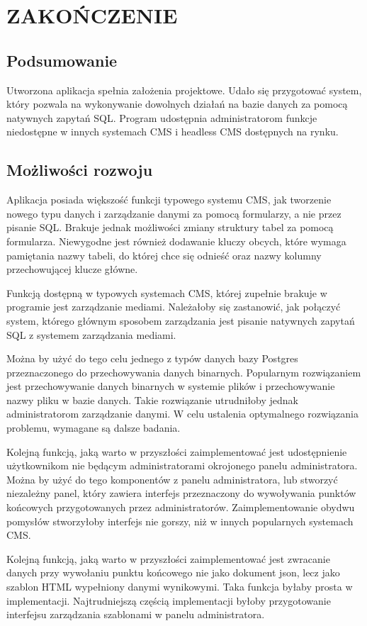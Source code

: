 \section{ZAKOŃCZENIE}

\subsection{Podsumowanie}

Utworzona aplikacja spełnia założenia projektowe. Udało się przygotować system,
który pozwala na wykonywanie dowolnych działań na bazie danych za pomocą
natywnych zapytań SQL. Program udostępnia administratorom funkcje niedostępne w
innych systemach CMS i headless CMS dostępnych na rynku.

\subsection{Możliwości rozwoju}

Aplikacja posiada większość funkcji typowego systemu CMS, jak tworzenie nowego
typu danych i zarządzanie danymi za pomocą formularzy, a nie przez pisanie SQL.
Brakuje jednak możliwości zmiany struktury tabel za pomocą formularza.
Niewygodne jest również dodawanie kluczy obcych, które wymaga pamiętania nazwy
tabeli, do której chce się odnieść oraz nazwy kolumny przechowującej klucze
główne.

Funkcją dostępną w typowych systemach CMS, której zupełnie brakuje w programie
jest zarządzanie mediami. Należałoby się zastanowić, jak połączyć system,
którego głównym sposobem zarządzania jest pisanie natywnych zapytań SQL z
systemem zarządzania mediami.

Można by użyć do tego celu jednego z typów danych bazy Postgres przeznaczonego do
przechowywania danych binarnych. Popularnym rozwiązaniem jest przechowywanie
danych binarnych w systemie plików i przechowywanie nazwy pliku w bazie danych.
Takie rozwiązanie utrudniłoby jednak administratorom zarządzanie danymi. W celu
ustalenia optymalnego rozwiązania problemu, wymagane są dalsze badania.

Kolejną funkcją, jaką warto w przyszłości zaimplementować jest udostępnienie
użytkownikom nie będącym administratorami okrojonego panelu administratora.
Można by użyć do tego komponentów z panelu administratora, lub stworzyć
niezależny panel, który zawiera interfejs przeznaczony do wywoływania punktów
końcowych przygotowanych przez administratorów. Zaimplementowanie obydwu
pomysłów stworzyłoby interfejs nie gorszy, niż w innych popularnych systemach
CMS.

Kolejną funkcją, jaką warto w przyszłości zaimplementować jest zwracanie danych
przy wywołaniu punktu końcowego nie jako dokument json, lecz jako szablon HTML
wypełniony danymi wynikowymi. Taka funkcja byłaby prosta w implementacji.
Najtrudniejszą częścią implementacji byłoby przygotowanie interfejsu zarządzania
szablonami w panelu administratora.
